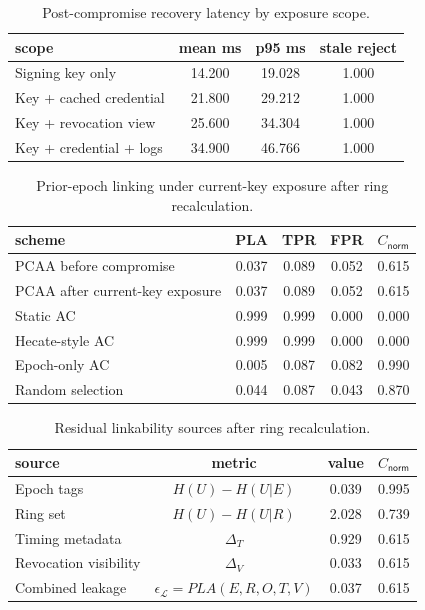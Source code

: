 \begin{table}[t]
\centering
\caption{Post-compromise recovery latency by exposure scope.}
\label{tab:recovery}
\begin{tabular}{@{}lccc@{}}
\toprule
scope & mean ms & p95 ms & stale reject \\
\midrule
Signing key only & 14.200 & 19.028 & 1.000 \\
Key + cached credential & 21.800 & 29.212 & 1.000 \\
Key + revocation view & 25.600 & 34.304 & 1.000 \\
Key + credential + logs & 34.900 & 46.766 & 1.000 \\
\bottomrule
\end{tabular}
\end{table}

\begin{table}[t]
\centering
\caption{Prior-epoch linking under current-key exposure after ring recalculation.}
\label{tab:unlinkability-current-key}
\begin{tabular}{@{}lcccc@{}}
\toprule
scheme & PLA & TPR & FPR & $C_{\mathsf{norm}}$ \\
\midrule
PCAA before compromise & 0.037 & 0.089 & 0.052 & 0.615 \\
PCAA after current-key exposure & 0.037 & 0.089 & 0.052 & 0.615 \\
Static AC & 0.999 & 0.999 & 0.000 & 0.000 \\
Hecate-style AC & 0.999 & 0.999 & 0.000 & 0.000 \\
Epoch-only AC & 0.005 & 0.087 & 0.082 & 0.990 \\
Random selection & 0.044 & 0.087 & 0.043 & 0.870 \\
\bottomrule
\end{tabular}
\end{table}

\begin{table}[t]
\centering
\caption{Residual linkability sources after ring recalculation.}
\label{tab:residual-sources}
\begin{tabular}{@{}lccc@{}}
\toprule
source & metric & value & $C_{\mathsf{norm}}$ \\
\midrule
Epoch tags & $H(U)-H(U|E)$ & 0.039 & 0.995 \\
Ring set & $H(U)-H(U|R)$ & 2.028 & 0.739 \\
Timing metadata & $\Delta_T$ & 0.929 & 0.615 \\
Revocation visibility & $\Delta_V$ & 0.033 & 0.615 \\
Combined leakage & $\epsilon_{\mathcal{L}}=PLA(E,R,O,T,V)$ & 0.037 & 0.615 \\
\bottomrule
\end{tabular}
\end{table}

